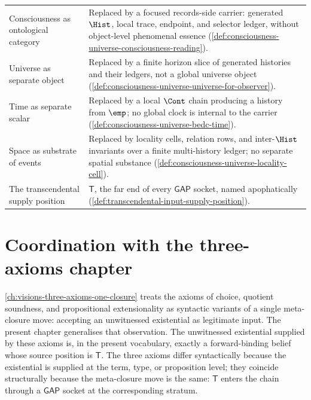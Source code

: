\begin{longtable}{p{}p{}}
Consciousness as ontological category & Replaced by a focused records-side carrier: generated $\Hist$, local trace, endpoint, and selector ledger, without object-level phenomenal essence (\autoref{def:consciousness-universe-consciousness-reading}). \\
Universe as separate object & Replaced by a finite horizon slice of generated histories and their ledgers, not a global universe object (\autoref{def:consciousness-universe-universe-for-observer}). \\
Time as separate scalar & Replaced by a local $\Cont$ chain producing a history from $\emp$; no global clock is internal to the carrier (\autoref{def:consciousness-universe-bedc-time}). \\
Space as substrate of events & Replaced by locality cells, relation rows, and inter-$\Hist$ invariants over a finite multi-history ledger; no separate spatial substance (\autoref{def:consciousness-universe-locality-cell}). \\
The transcendental supply position & $\mathsf{T}$, the far end of every $\mathsf{GAP}$ socket, named apophatically (\autoref{def:transcendental-input-supply-position}). \\
\bottomrule
\end{longtable}

\section{Coordination with the three-axioms chapter}
\label{sec:hard-problems-coordination-three-axioms}

\autoref{ch:visions-three-axioms-one-closure} treats the axioms of choice, quotient soundness, and propositional extensionality as syntactic variants of a single meta-closure move: accepting an unwitnessed existential as legitimate input. The present chapter generalises that observation. The unwitnessed existential supplied by these axioms is, in the present vocabulary, exactly a forward-binding belief whose source position is $\mathsf{T}$. The three axioms differ syntactically because the existential is supplied at the term, type, or proposition level; they coincide structurally because the meta-closure move is the same: $\mathsf{T}$ enters the chain through a $\mathsf{GAP}$ socket at the corresponding stratum.

